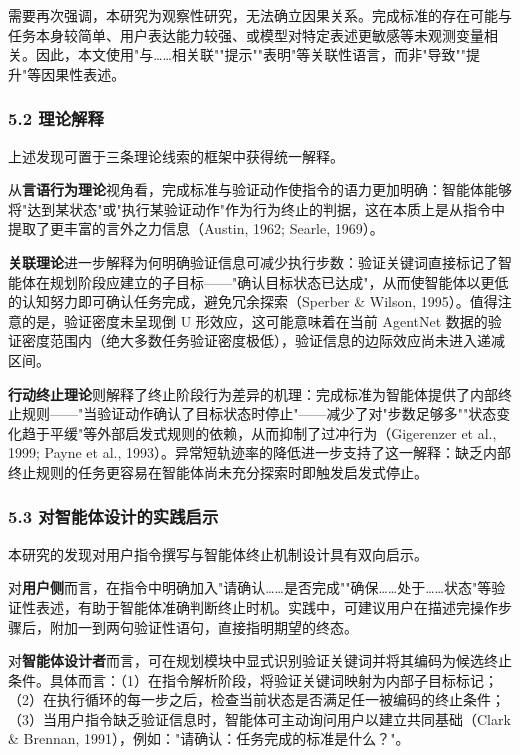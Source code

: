 \documentclass[12pt,a4paper,openany,oneside]{ctexrep}
\begin{document}
需要再次强调，本研究为观察性研究，无法确立因果关系。完成标准的存在可能与任务本身较简单、用户表达能力较强、或模型对特定表述更敏感等未观测变量相关。因此，本文使用"与……相关联""提示""表明"等关联性语言，而非"导致""提升"等因果性表述。

\subsubsection{5.2 理论解释}


上述发现可置于三条理论线索的框架中获得统一解释。

从\textbf{言语行为理论}视角看，完成标准与验证动作使指令的语力更加明确：智能体能够将"达到某状态"或"执行某验证动作"作为行为终止的判据，这在本质上是从指令中提取了更丰富的言外之力信息（Austin, 1962; Searle, 1969）。

\textbf{关联理论}进一步解释为何明确验证信息可减少执行步数：验证关键词直接标记了智能体在规划阶段应建立的子目标——"确认目标状态已达成"，从而使智能体以更低的认知努力即可确认任务完成，避免冗余探索（Sperber \& Wilson, 1995）。值得注意的是，验证密度未呈现倒 U 形效应，这可能意味着在当前 AgentNet 数据的验证密度范围内（绝大多数任务验证密度极低），验证信息的边际效应尚未进入递减区间。

\textbf{行动终止理论}则解释了终止阶段行为差异的机理：完成标准为智能体提供了内部终止规则——"当验证动作确认了目标状态时停止"——减少了对"步数足够多""状态变化趋于平缓"等外部启发式规则的依赖，从而抑制了过冲行为（Gigerenzer et al., 1999; Payne et al., 1993）。异常短轨迹率的降低进一步支持了这一解释：缺乏内部终止规则的任务更容易在智能体尚未充分探索时即触发启发式停止。

\subsubsection{5.3 对智能体设计的实践启示}


本研究的发现对用户指令撰写与智能体终止机制设计具有双向启示。

对\textbf{用户侧}而言，在指令中明确加入"请确认……是否完成""确保……处于……状态"等验证性表述，有助于智能体准确判断终止时机。实践中，可建议用户在描述完操作步骤后，附加一到两句验证性语句，直接指明期望的终态。

对\textbf{智能体设计者}而言，可在规划模块中显式识别验证关键词并将其编码为候选终止条件。具体而言：（1）在指令解析阶段，将验证关键词映射为内部子目标标记；（2）在执行循环的每一步之后，检查当前状态是否满足任一被编码的终止条件；（3）当用户指令缺乏验证信息时，智能体可主动询问用户以建立共同基础（Clark \& Brennan, 1991），例如："请确认：任务完成的标准是什么？"。
\end{document}
